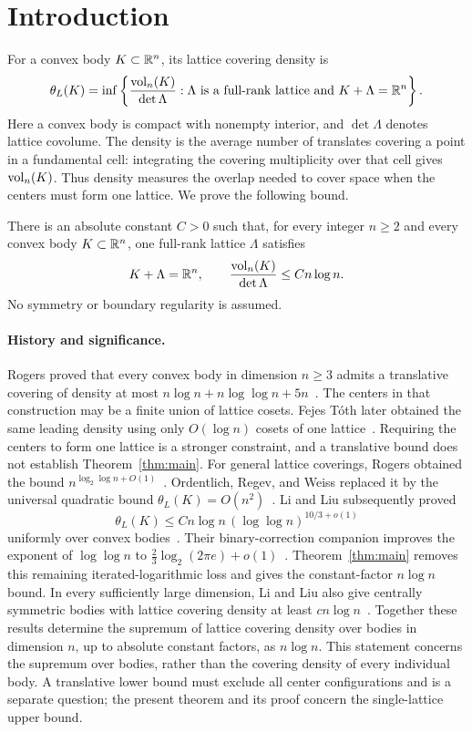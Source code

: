 \section{Introduction}\label{sec:introduction}

For a convex body $K\subset\mathbb R^n$, its lattice covering density is
\[
 \theta_L(K)=\inf\left\{
 \frac{\operatorname{vol}_n(K)}{\det\Lambda}:\Lambda\text{ is a full-rank lattice and }
 K+\Lambda=\mathbb R^n\right\}.
\]
Here a convex body is compact with nonempty interior, and
$\det\Lambda$ denotes lattice covolume. The density is the average number
of translates covering a point in a fundamental cell: integrating the
covering multiplicity over that cell gives $\operatorname{vol}_n(K)$. Thus density
measures the overlap needed to cover space when the centers must form
one lattice. We prove the following bound.

\begin{theorem}\label{thm:main}
There is an absolute constant $C>0$ such that, for every integer
$n\ge2$ and every convex body $K\subset\mathbb R^n$, one full-rank lattice
$\Lambda$ satisfies
\[
 K+\Lambda=\mathbb R^n,\qquad
 \frac{\operatorname{vol}_n(K)}{\det\Lambda}\le Cn\log n.
\]
No symmetry or boundary regularity is assumed.
\end{theorem}

\paragraph{History and significance.}
Rogers proved that every convex body in dimension $n\ge3$ admits a
translative covering of density at most
$n\log n+n\log\log n+5n$~\cite{Rog57}.
The centers in that construction may be a finite union of lattice
cosets. Fejes T\'oth later obtained the same leading density using only
$O(\log n)$ cosets of one lattice~\cite{FT09}.
Requiring the centers to form one lattice is a stronger
constraint, and a translative bound does not establish
Theorem~\ref{thm:main}.
For general lattice coverings, Rogers obtained the bound
$n^{\log_2\log n+O(1)}$~\cite{Rog59}. Ordentlich, Regev, and Weiss
replaced it by the universal quadratic bound
$\theta_L(K)=O(n^2)$~\cite[Theorem~1.1]{ORW}. Li and Liu subsequently proved
\[
 \theta_L(K)\le Cn\log n\,(\log\log n)^{10/3+o(1)}
\]
uniformly over convex bodies~\cite[Theorem~1.2]{LL}.
Their binary-correction companion improves the exponent of
$\log\log n$ to
$\frac23\log_2(2\pi e)+o(1)$~\cite[Theorem~1.1]{LLC}.
Theorem~\ref{thm:main} removes this remaining iterated-logarithmic loss
and gives the constant-factor $n\log n$ bound.
In every sufficiently large dimension, Li and Liu also give centrally
symmetric bodies with lattice covering density at least
$cn\log n$~\cite[Theorem~1.3]{LL}. Together these
results determine the supremum of lattice covering density over bodies
in dimension $n$, up to absolute constant factors, as $n\log n$.
This statement concerns the supremum over bodies, rather than the covering
density of every individual body. A translative lower bound must exclude
all center configurations and is a separate question; the present theorem
and its proof concern the single-lattice upper bound.

